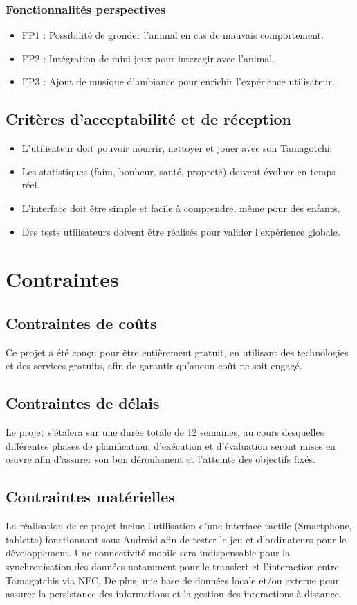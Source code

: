 \documentclass{rapportECL}
\begin{document}
\subsubsection{Fonctionnalités perspectives}
\begin{itemize}[label=\textendash]
\item FP1 : Possibilité de gronder l’animal en cas de mauvais comportement.

\item FP2 : Intégration de mini-jeux pour interagir avec l’animal.

\item FP3 : Ajout de musique d’ambiance pour enrichir l’expérience utilisateur.
\end{itemize}
\subsection{Critères d’acceptabilité et de réception}
\begin{itemize}[label=\textbullet]
\item L'utilisateur doit pouvoir nourrir, nettoyer et jouer avec son Tamagotchi.
\item Les statistiques (faim, bonheur, santé, propreté) doivent évoluer en temps réel.
\item L'interface doit être simple et facile à comprendre, même pour des enfants.
\item Des tests utilisateurs doivent être réalisés pour valider l'expérience globale.
\end{itemize}
\section{Contraintes}
\subsection{Contraintes de coûts}
Ce projet a été conçu pour être entièrement gratuit, en utilisant des technologies et des services gratuits, afin de garantir qu'aucun coût ne soit engagé.
\subsection{Contraintes de délais}
Le projet s'étalera sur une durée totale de 12 semaines, au cours desquelles différentes phases de planification, d'exécution et d'évaluation seront mises en œuvre afin d'assurer son bon déroulement et l'atteinte des objectifs fixés.
\subsection{Contraintes matérielles}
La réalisation de ce projet inclue l’utilisation d’une interface tactile (Smartphone, tablette) fonctionnant sous Android afin de tester le jeu et d’ordinateurs pour le développement. Une connectivité mobile sera indispensable pour la synchronisation des données notamment pour le transfert et l’interaction entre Tamagotchis via NFC.
De plus, une base de données locale et/ou externe pour assurer la persistance des informations et la gestion des interactions à distance.
\end{document}

